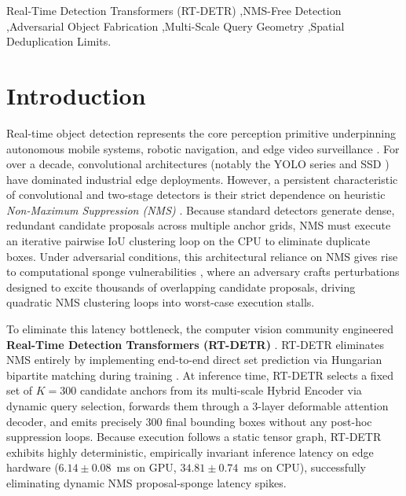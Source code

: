 \documentclass[preprint,12pt]{elsarticle}
\begin{document}
\begin{frontmatter}
\begin{abstract}
deduplication functions solely as a volume-mitigation heuristic rather than an intrinsic defense.
\end{abstract}

\begin{keyword}
Real-Time Detection Transformers (RT-DETR) \sep NMS-Free Detection \sep Adversarial Object Fabrication \sep Multi-Scale Query Geometry \sep Spatial Deduplication Limits.
\end{keyword}

\end{frontmatter}

\section{Introduction}
\label{sec:introduction}

Real-time object detection represents the core perception primitive underpinning autonomous mobile systems, robotic navigation, and edge video surveillance \citep{zhao2024detrs, carion2020end}. For over a decade, convolutional architectures (notably the YOLO series \citep{wang2024yolov9, bochkovskiy2020yolov4} and SSD \citep{liu2016ssd}) have dominated industrial edge deployments. However, a persistent characteristic of convolutional and two-stage detectors is their strict dependence on heuristic \textit{Non-Maximum Suppression (NMS)} \citep{neubeck2006efficient}. Because standard detectors generate dense, redundant candidate proposals across multiple anchor grids, NMS must execute an iterative pairwise IoU clustering loop on the CPU to eliminate duplicate boxes. Under adversarial conditions, this architectural reliance on NMS gives rise to computational sponge vulnerabilities \citep{chen2024overload, shapira2023phantom}, where an adversary crafts perturbations designed to excite thousands of overlapping candidate proposals, driving quadratic NMS clustering loops into worst-case execution stalls.

To eliminate this latency bottleneck, the computer vision community engineered \textbf{Real-Time Detection Transformers (RT-DETR)} \citep{zhao2024detrs, zhu2020deformable}. RT-DETR eliminates NMS entirely by implementing end-to-end direct set prediction via Hungarian bipartite matching during training \citep{kuhn1955hungarian}. At inference time, RT-DETR selects a fixed set of $K=300$ candidate anchors from its multi-scale Hybrid Encoder via dynamic query selection, forwards them through a 3-layer deformable attention decoder, and emits precisely 300 final bounding boxes without any post-hoc suppression loops. Because execution follows a static tensor graph, RT-DETR exhibits highly deterministic, empirically invariant inference latency on edge hardware ($6.14 \pm 0.08$~ms on GPU, $34.81 \pm 0.74$~ms on CPU), successfully eliminating dynamic NMS proposal-sponge latency spikes.
\end{document}

